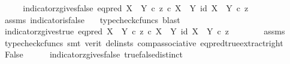 \begin{isabellebody}
\ \ \isamarkupfalse%
\ \isamarkupfalse%
\ indicator{\isacharunderscore}{\kern0pt}z{\isacharunderscore}{\kern0pt}gives{\isacharunderscore}{\kern0pt}false{\isacharcolon}{\kern0pt}\ {\isachardoublequoteopen}{\isacharparenleft}{\kern0pt}eq{\isacharunderscore}{\kern0pt}pred\ {\isacharparenleft}{\kern0pt}X\ {\isasymCoprod}\ Y{\isacharparenright}{\kern0pt}\ {\isasymcirc}\isactrlsub c\ {\isasymlangle}z\ {\isasymcirc}\isactrlsub c\ {\isasymbeta}\isactrlbsub X\ {\isasymCoprod}\ Y\isactrlesub {\isacharcomma}{\kern0pt}\ id\ {\isacharparenleft}{\kern0pt}X\ {\isasymCoprod}\ Y{\isacharparenright}{\kern0pt}{\isasymrangle}{\isacharparenright}{\kern0pt}\ {\isasymcirc}\isactrlsub c\ z\ {\isacharequal}{\kern0pt}\ {\isasymf}{\isachardoublequoteclose}\isanewline
\ \ \ \ \isamarkupfalse%
\ assms\ indicator{\isacharunderscore}{\kern0pt}is{\isacharunderscore}{\kern0pt}false\ \ \isamarkupfalse%
\ {\isacharparenleft}{\kern0pt}typecheck{\isacharunderscore}{\kern0pt}cfuncs{\isacharcomma}{\kern0pt}\ blast{\isacharparenright}{\kern0pt}\isanewline
\ \ \isamarkupfalse%
\ \isamarkupfalse%
\ indicator{\isacharunderscore}{\kern0pt}z{\isacharunderscore}{\kern0pt}gives{\isacharunderscore}{\kern0pt}true{\isacharcolon}{\kern0pt}\ {\isachardoublequoteopen}{\isacharparenleft}{\kern0pt}eq{\isacharunderscore}{\kern0pt}pred\ {\isacharparenleft}{\kern0pt}X\ {\isasymCoprod}\ Y{\isacharparenright}{\kern0pt}\ {\isasymcirc}\isactrlsub c\ {\isasymlangle}z\ {\isasymcirc}\isactrlsub c\ {\isasymbeta}\isactrlbsub X\ {\isasymCoprod}\ Y\isactrlesub {\isacharcomma}{\kern0pt}\ id\ {\isacharparenleft}{\kern0pt}X\ {\isasymCoprod}\ Y{\isacharparenright}{\kern0pt}{\isasymrangle}{\isacharparenright}{\kern0pt}\ {\isasymcirc}\isactrlsub c\ z\ {\isacharequal}{\kern0pt}\ {\isasymt}{\isachardoublequoteclose}\isanewline
\ \ \ \ \isamarkupfalse%
\ assms\ \isamarkupfalse%
\ {\isacharparenleft}{\kern0pt}typecheck{\isacharunderscore}{\kern0pt}cfuncs{\isacharcomma}{\kern0pt}\ smt\ {\isacharparenleft}{\kern0pt}verit{\isacharcomma}{\kern0pt}\ del{\isacharunderscore}{\kern0pt}insts{\isacharparenright}{\kern0pt}\ comp{\isacharunderscore}{\kern0pt}associative{}\ eq{\isacharunderscore}{\kern0pt}pred{\isacharunderscore}{\kern0pt}true{\isacharunderscore}{\kern0pt}extract{\isacharunderscore}{\kern0pt}right{\isacharparenright}{\kern0pt}\isanewline
\ \ \isamarkupfalse%
\ \isamarkupfalse%
\ False\isanewline
\ \ \ \ \isamarkupfalse%
\ indicator{\isacharunderscore}{\kern0pt}z{\isacharunderscore}{\kern0pt}gives{\isacharunderscore}{\kern0pt}false\ true{\isacharunderscore}{\kern0pt}false{\isacharunderscore}{\kern0pt}distinct\ \isamarkupfalse%

\end{isabellebody}

